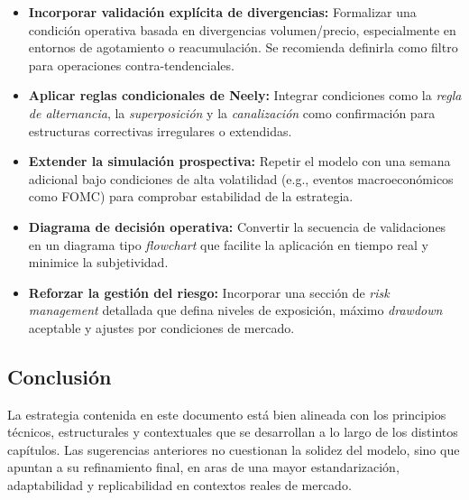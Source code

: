 \begin{itemize}
\item \textbf{Incorporar validaci\'on expl\'icita de divergencias:} Formalizar una condici\'on operativa basada en divergencias volumen/precio, especialmente en entornos de agotamiento o reacumulaci\'on. Se recomienda definirla como filtro para operaciones contra-tendenciales.
\item \textbf{Aplicar reglas condicionales de Neely:} Integrar condiciones como la \textit{regla de alternancia}, la \textit{superposici\'on} y la \textit{canalizaci\'on} como confirmaci\'on para estructuras correctivas irregulares o extendidas.
\item \textbf{Extender la simulaci\'on prospectiva:} Repetir el modelo con una semana adicional bajo condiciones de alta volatilidad (e.g., eventos macroecon\'omicos como FOMC) para comprobar estabilidad de la estrategia.
\item \textbf{Diagrama de decisi\'on operativa:} Convertir la secuencia de validaciones en un diagrama tipo \textit{flowchart} que facilite la aplicaci\'on en tiempo real y minimice la subjetividad.
\item \textbf{Reforzar la gesti\'on del riesgo:} Incorporar una secci\'on de \textit{risk management} detallada que defina niveles de exposici\'on, m\'aximo \textit{drawdown} aceptable y ajustes por condiciones de mercado.
\end{itemize}

\subsection*{Conclusi\'on}

La estrategia contenida en este documento est\'a bien alineada con los principios t\'ecnicos, estructurales y contextuales que se desarrollan a lo largo de los distintos cap\'itulos. Las sugerencias anteriores no cuestionan la solidez del modelo, sino que apuntan a su refinamiento final, en aras de una mayor estandarizaci\'on, adaptabilidad y replicabilidad en contextos reales de mercado.
